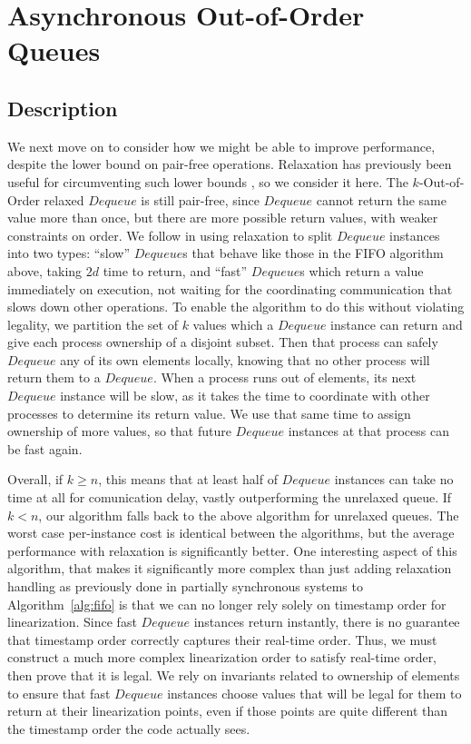 \documentclass[a4paper,anonymous,USenglish]{lipics-v2021}
\theoremstyle{definition}
\begin{document}
  
\section{Asynchronous Out-of-Order Queues}

\subsection{Description}

We next move on to consider how we might be able to improve performance, despite the lower bound on pair-free operations.  Relaxation has previously been useful for circumventing such lower bounds \cite{TalmageWelch14}, so we consider it here.  The $k$-Out-of-Order relaxed $Dequeue$ is still pair-free, since $Dequeue$ cannot return the same value more than once, but there are more possible return values, with weaker constraints on order.  We follow \cite{TalmageWelch14} in using relaxation to split $Dequeue$ instances into two types: ``slow'' $Dequeue$s that behave like those in the FIFO algorithm above, taking $2d$ time to return, and ``fast'' $Dequeue$s which return a value immediately on execution, not waiting for the coordinating communication that slows down other operations.  To enable the algorithm to do this without violating legality, we partition the set of $k$ values which a $Dequeue$ instance can return and give each process ownership of a disjoint subset.  Then that process can safely $Dequeue$ any of its own elements locally, knowing that no other process will return them to a $Dequeue$.  When a process runs out of elements, its next $Dequeue$ instance will be slow, as it takes the time to coordinate with other processes to determine its return value.  We use that same time to assign ownership of more values, so that future $Dequeue$ instances at that process can be fast again.

Overall, if $k \geq n$, this means that at least half of $Dequeue$ instances can take no time at all for comunication delay, vastly outperforming the unrelaxed queue.  If $k < n$, our algorithm falls back to the above algorithm for unrelaxed queues.  The worst case per-instance cost is identical between the algorithms, but the average performance with relaxation is significantly better.  One interesting aspect of this algorithm, that makes it significantly more complex than just adding relaxation handling as previously done in partially synchronous systems to Algorithm~\ref{alg:fifo} is that we can no longer rely solely on timestamp order for linearization.  Since fast $Dequeue$ instances return instantly, there is no guarantee that timestamp order correctly captures their real-time order.  Thus, we must construct a much more complex linearization order to satisfy real-time order, then prove that it is legal.  We rely on invariants related to ownership of elements to ensure that fast $Dequeue$ instances choose values that will be legal for them to return at their linearization points, even if those points are quite different than the timestamp order the code actually sees. 
\end{document}
